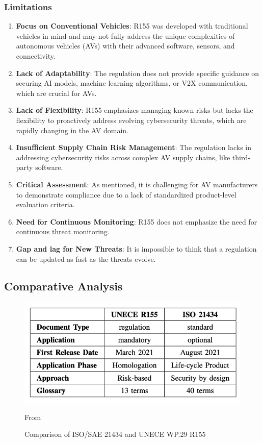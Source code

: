 \subsubsection{Limitations}\label{subsubsec:limitations-2}
\begin{enumerate}
    \item \textbf{Focus on Conventional Vehicles}: R155 was developed with traditional vehicles in mind and may not fully address the unique complexities of autonomous vehicles (AVs) with their advanced software, sensors, and connectivity.
    \item \textbf{Lack of Adaptability}: The regulation does not provide specific guidance on securing AI models, machine learning algorithms, or V2X communication, which are crucial for AVs.
    \item \textbf{Lack of Flexibility}: R155 emphasizes managing known risks but lacks the flexibility to proactively address evolving cybersecurity threats, which are rapidly changing in the AV domain.
    \item \textbf{Insufficient Supply Chain Risk Management}: The regulation lacks in addressing cybersecurity risks across complex AV supply chains, like third-party software.
    \item \textbf{Critical Assessment}: As mentioned, it is challenging for AV manufacturers to demonstrate compliance due to a lack of standardized product-level evaluation criteria.
    \item \textbf{Need for Continuous Monitoring}: R155 does not emphasize the need for continuous threat monitoring.
    \item \textbf{Gap and lag for New Threats}: It is impossible to think that a regulation can be updated as fast as the threats evolve.
\end{enumerate}


\subsection{Comparative Analysis}\label{subsec:comparative-analysis}
\begin{figure}[!htb]
    \centering
    \includegraphics[width=0.7\linewidth]{figures/diff-standards}
    \caption{Comparison of ISO/SAE 21434 and UNECE WP.29 R155}
    \footnotesize{From~\cite{comparison-standard} }
    \label{fig:comparison}
\end{figure}

